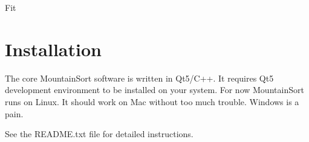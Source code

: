 \documentclass[hidelinks,10pt]{article}
\begin{document}
\begin{algorithm}
\DontPrintSemicolon %

\caption{{\sc Fit}}
\label{algo:fit}
\end{algorithm}


\section {Installation}

The core MountainSort software is written in Qt5/C++. It requires Qt5 development environment to be installed on your system. For now MountainSort runs on Linux. It should work on Mac without too much trouble. Windows is a pain.

See the README.txt file for detailed instructions.
\end{document}
